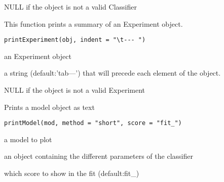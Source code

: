 \documentclass[a4paper]{book}
\begin{document}
%
\begin{Value}
NULL if the object is not a valid Classifier
\end{Value}
%
\begin{Description}
This function prints a summary of an Experiment object.
\end{Description}
%
\begin{Usage}
\begin{verbatim}
printExperiment(obj, indent = "\t--- ")
\end{verbatim}
\end{Usage}
%
\begin{Arguments}
\begin{ldescription}
\item[\code{obj:}] an Experiment object

\item[\code{indent:}] a string (default:'tab---') that will precede each element of the object.
\end{ldescription}
\end{Arguments}
%
\begin{Value}
NULL if the object is not a valid Experiment
\end{Value}
%
\begin{Description}
Prints a model object as text
\end{Description}
%
\begin{Usage}
\begin{verbatim}
printModel(mod, method = "short", score = "fit_")
\end{verbatim}
\end{Usage}
%
\begin{Arguments}
\begin{ldescription}
\item[\code{mod:}] a model to plot

\item[\code{method:}] an object containing the different parameters of the classifier

\item[\code{score:}] which score to show in the fit (default:fit\_)
\end{ldescription}
\end{Arguments}
\end{document}
